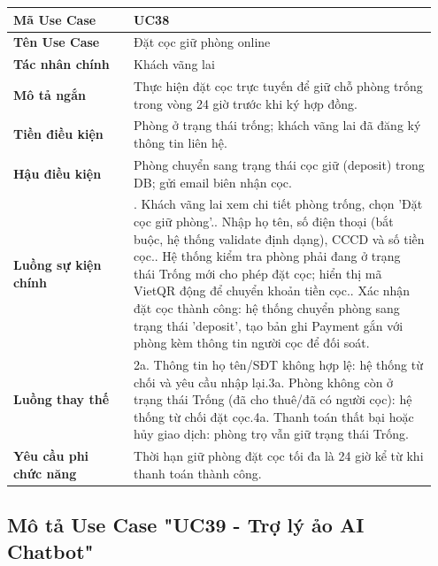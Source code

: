 \begin{longtable}[]{@{}>{\RaggedRight\arraybackslash}p{0.27\linewidth}>{\RaggedRight\arraybackslash}p{0.68\linewidth}@{}}
\toprule
\textbf{Mã Use Case} & UC38\tabularnewline
\midrule
\endhead
\textbf{Tên Use Case} & Đặt cọc giữ phòng online\tabularnewline
\textbf{Tác nhân chính} & Khách vãng lai\tabularnewline
\textbf{Mô tả ngắn} & Thực hiện đặt cọc trực tuyến để giữ chỗ phòng
trống trong vòng 24 giờ trước khi ký hợp đồng.\tabularnewline
\textbf{Tiền điều kiện} & Phòng ở trạng thái trống; khách vãng lai đã
đăng ký thông tin liên hệ.\tabularnewline
\textbf{Hậu điều kiện} & Phòng chuyển sang trạng thái cọc giữ (deposit)
trong DB; gửi email biên nhận cọc.\tabularnewline
\textbf{Luồng sự kiện chính} & 1. Khách vãng lai xem
chi tiết phòng trống, chọn 'Đặt cọc giữ phòng'.\newline 2. Nhập họ
tên, số điện thoại (bắt buộc, hệ thống validate định dạng), CCCD và số
tiền cọc.\newline 3. Hệ thống kiểm tra phòng phải đang ở trạng thái
Trống mới cho phép đặt cọc; hiển thị mã VietQR động để chuyển khoản tiền
cọc.\newline 4. Xác nhận đặt cọc thành công: hệ thống chuyển phòng
sang trạng thái 'deposit', tạo bản ghi Payment gắn với phòng kèm thông
tin người cọc để đối soát.\tabularnewline
\textbf{Luồng thay thế} & 2a. Thông tin họ tên/SĐT
không hợp lệ: hệ thống từ chối và yêu cầu nhập lại.\newline 3a.
Phòng không còn ở trạng thái Trống (đã cho thuê/đã có người cọc): hệ
thống từ chối đặt cọc.\newline 4a. Thanh toán thất bại hoặc hủy
giao dịch: phòng trọ vẫn giữ trạng thái Trống.\tabularnewline
\textbf{Yêu cầu phi chức năng} & Thời hạn giữ phòng đặt cọc tối đa là 24
giờ kể từ khi thanh toán thành công.\tabularnewline
\bottomrule
\end{longtable}

\subsection{Mô tả Use Case "UC39 - Trợ lý ảo AI Chatbot"}

